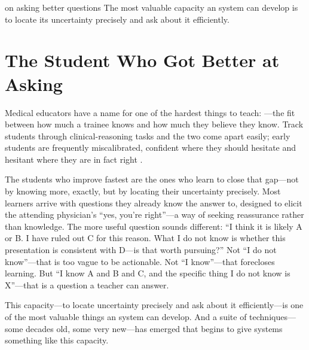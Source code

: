 
\label{chap:ch17}
\begin{chapterquote}{on asking better questions}
The most valuable capacity an \ai system can develop is to locate its uncertainty precisely and ask about it efficiently.
\end{chapterquote}

\section{The Student Who Got Better at Asking}
\label{sec:ch17-opening-story}

Medical educators have a name for one of the hardest things to teach: ---the fit between how much a trainee knows and how much they believe they know. Track students through clinical-reasoning tasks and the two come apart easily; early students are frequently miscalibrated, confident where they should hesitate and hesitant where they are in fact right \autocite{cleary2019calibration}.

The students who improve fastest are the ones who learn to close that gap---not by knowing more, exactly, but by locating their uncertainty precisely. Most learners arrive with questions they already know the answer to, designed to elicit the attending physician's ``yes, you're right''---a way of seeking reassurance rather than knowledge. The more useful question sounds different: ``I think it is likely A or B. I have ruled out C for this reason. What I do not know is whether this presentation is consistent with D---is that worth pursuing?'' Not ``I do not know''---that is too vague to be actionable. Not ``I know''---that forecloses learning. But ``I know A and B and C, and the specific thing I do not know is X''---that is a question a teacher can answer.

This capacity---to locate uncertainty precisely and ask about it efficiently---is one of the most valuable things an \ai system can develop. And a suite of techniques---some decades old, some very new---has emerged that begins to give \ai systems something like this capacity.

